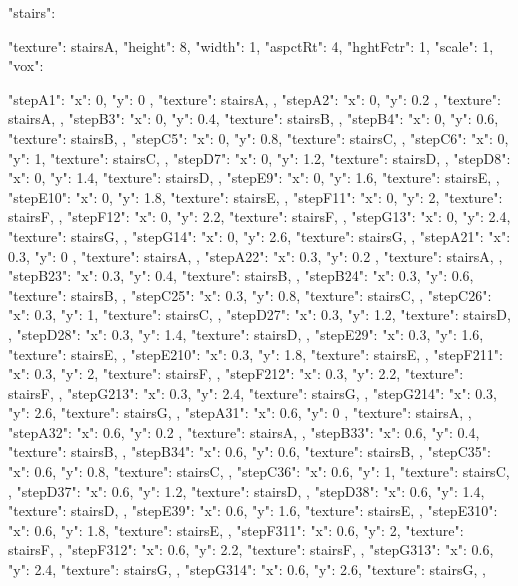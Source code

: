 {  "stairs":{
    "texture": stairsA,
    "height": 8,
    "width": 1,
    "aspctRt": 4,
    "hghtFctr": 1,
    "scale": 1,
    "vox": {
      "stepA1":{ "x": 0, "y": 0  , "texture": stairsA, },
      "stepA2":{ "x": 0, "y": 0.2  , "texture": stairsA, },
      "stepB3":{ "x": 0, "y": 0.4, "texture": stairsB, },
      "stepB4":{ "x": 0, "y": 0.6, "texture": stairsB, },
      "stepC5":{ "x": 0, "y": 0.8, "texture": stairsC, },
      "stepC6":{ "x": 0, "y": 1, "texture": stairsC, },
      "stepD7":{ "x": 0, "y": 1.2, "texture": stairsD, },
      "stepD8":{ "x": 0, "y": 1.4, "texture": stairsD, },
      "stepE9":{ "x": 0, "y": 1.6, "texture": stairsE, },
      "stepE10":{ "x": 0, "y": 1.8, "texture": stairsE, },
      "stepF11":{ "x": 0, "y": 2,   "texture": stairsF, },
      "stepF12":{ "x": 0, "y": 2.2,   "texture": stairsF, },
      "stepG13":{ "x": 0, "y": 2.4, "texture": stairsG, },
      "stepG14":{ "x": 0, "y": 2.6, "texture": stairsG, },
      "stepA21":{ "x": 0.3, "y": 0  , "texture": stairsA, },
      "stepA22":{ "x": 0.3, "y": 0.2  , "texture": stairsA, },
      "stepB23":{ "x": 0.3, "y": 0.4, "texture": stairsB, },
      "stepB24":{ "x": 0.3, "y": 0.6, "texture": stairsB, },
      "stepC25":{ "x": 0.3, "y": 0.8, "texture": stairsC, },
      "stepC26":{ "x": 0.3, "y": 1, "texture": stairsC, },
      "stepD27":{ "x": 0.3, "y": 1.2, "texture": stairsD, },
      "stepD28":{ "x": 0.3, "y": 1.4, "texture": stairsD, },
      "stepE29":{ "x": 0.3, "y": 1.6, "texture": stairsE, },
      "stepE210":{ "x": 0.3, "y": 1.8, "texture": stairsE, },
      "stepF211":{ "x": 0.3, "y": 2,   "texture": stairsF, },
      "stepF212":{ "x": 0.3, "y": 2.2,   "texture": stairsF, },
      "stepG213":{ "x": 0.3, "y": 2.4, "texture": stairsG, },
      "stepG214":{ "x": 0.3, "y": 2.6, "texture": stairsG, },
      "stepA31":{ "x": 0.6, "y": 0  , "texture": stairsA, },
      "stepA32":{ "x": 0.6, "y": 0.2  , "texture": stairsA, },
      "stepB33":{ "x": 0.6, "y": 0.4, "texture": stairsB, },
      "stepB34":{ "x": 0.6, "y": 0.6, "texture": stairsB, },
      "stepC35":{ "x": 0.6, "y": 0.8, "texture": stairsC, },
      "stepC36":{ "x": 0.6, "y": 1, "texture": stairsC, },
      "stepD37":{ "x": 0.6, "y": 1.2, "texture": stairsD, },
      "stepD38":{ "x": 0.6, "y": 1.4, "texture": stairsD, },
      "stepE39":{ "x": 0.6, "y": 1.6, "texture": stairsE, },
      "stepE310":{ "x": 0.6, "y": 1.8, "texture": stairsE, },
      "stepF311":{ "x": 0.6, "y": 2,   "texture": stairsF, },
      "stepF312":{ "x": 0.6, "y": 2.2,   "texture": stairsF, },
      "stepG313":{ "x": 0.6, "y": 2.4, "texture": stairsG, },
      "stepG314":{ "x": 0.6, "y": 2.6, "texture": stairsG, },

}}}
